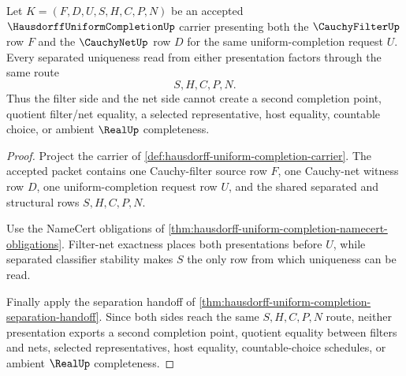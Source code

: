 \begin{theorem}
\label{thm:hausdorff-uniform-completion-filter-net-coincidence}
Let $K=(F,D,U,S,H,C,P,N)$ be an accepted $\HausdorffUniformCompletionUp$ carrier presenting both the $\CauchyFilterUp$ row $F$ and the $\CauchyNetUp$ row $D$ for the same uniform-completion request $U$. Every separated uniqueness read from either presentation factors through the same route
$$
S,H,C,P,N.
$$
Thus the filter side and the net side cannot create a second completion point, quotient filter/net equality, a selected representative, host equality, countable choice, or ambient $\RealUp$ completeness.
\end{theorem}
\begin{proof}
Project the carrier of \autoref{def:hausdorff-uniform-completion-carrier}. The accepted packet contains one Cauchy-filter source row $F$, one Cauchy-net witness row $D$, one uniform-completion request row $U$, and the shared separated and structural rows $S,H,C,P,N$.

Use the NameCert obligations of \autoref{thm:hausdorff-uniform-completion-namecert-obligations}. Filter-net exactness places both presentations before $U$, while separated classifier stability makes $S$ the only row from which uniqueness can be read.

Finally apply the separation handoff of \autoref{thm:hausdorff-uniform-completion-separation-handoff}. Since both sides reach the same $S,H,C,P,N$ route, neither presentation exports a second completion point, quotient equality between filters and nets, selected representatives, host equality, countable-choice schedules, or ambient $\RealUp$ completeness.
\end{proof}



